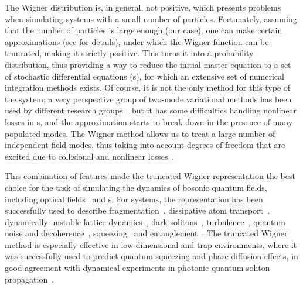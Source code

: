The Wigner distribution is, in general, not positive, which presents problems when simulating systems with a small number of particles.
Fortunately, assuming that the number of particles is large enough (our case), one can make certain approximations (see  for details), under which the Wigner function can be truncated, making it strictly positive.
This turns it into a probability distribution, thus providing a way to reduce the initial master equation to a set of stochastic differential equations (s), for which an extensive set of numerical integration methods exists.
Of course, it is not the only method for this type of the system; a very perspective group of two-mode variational methods has been used by different research groups~\cite{Li2008,Li2009,Sinatra2011}, but it has some difficulties handling nonlinear losses in s, and the approximation starts to break down in the presence of many populated modes.
The Wigner method allows us to treat a large number of independent field modes, thus taking into account degrees of freedom that are excited due to collisional and nonlinear losses~\cite{Norrie2005,Deuar2007}.

This combination of features made the truncated Wigner representation the best choice for the task of simulating the dynamics of bosonic quantum fields, including optical fields~\cite{Drummond1993,Drummond1993a,Corney2006,Corney2008} and s.
For  systems, the representation has been successfully used to describe fragmentation~\cite{Isella2005,Isella2006,Gross2011}, dissipative atom transport~\cite{Ruostekoski2005}, dynamically unstable lattice dynamics~\cite{Shrestha2009}, dark solitons~\cite{Martin2010,Martin2010a}, turbulence~\cite{Norrie2005,Norrie2006}, quantum noise and decoherence~\cite{Steel1998,Norrie2006a,Egorov2011}, squeezing~\cite{Opanchuk2012} and entanglement~\cite{Opanchuk2012a}.
The truncated Wigner method is especially effective in low-dimensional and trap environments, where it was successfully used to predict quantum squeezing and phase-diffusion effects, in good agreement with dynamical experiments in photonic quantum soliton propagation~\cite{Carter1987,Corney2008}.

